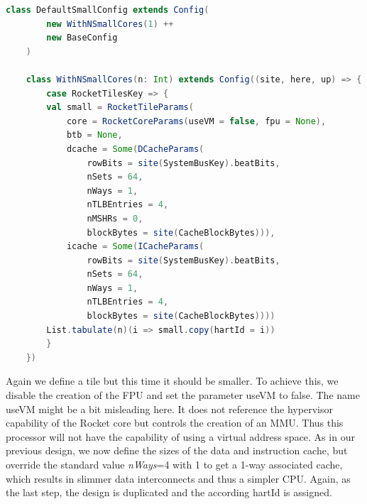 \begin{lstlisting}[language=scala, frame=single]
    class DefaultSmallConfig extends Config(
        new WithNSmallCores(1) ++
        new BaseConfig
    )

    class WithNSmallCores(n: Int) extends Config((site, here, up) => {
        case RocketTilesKey => {
        val small = RocketTileParams(
            core = RocketCoreParams(useVM = false, fpu = None),
            btb = None,
            dcache = Some(DCacheParams(
                rowBits = site(SystemBusKey).beatBits,
                nSets = 64,
                nWays = 1,
                nTLBEntries = 4,
                nMSHRs = 0,
                blockBytes = site(CacheBlockBytes))),
            icache = Some(ICacheParams(
                rowBits = site(SystemBusKey).beatBits,
                nSets = 64,
                nWays = 1,
                nTLBEntries = 4,
                blockBytes = site(CacheBlockBytes))))
        List.tabulate(n)(i => small.copy(hartId = i))
        }
    })
\end{lstlisting}
Again we define a tile but this time it should be smaller.
To achieve this, we disable the creation of
the FPU and set the parameter useVM to false.
The name useVM might be a bit misleading here.
It does not reference the hypervisor capability of the
Rocket core but controls the creation of an MMU.
Thus this processor will
not have the capability of using a virtual address space.
As in our previous design, we now define the sizes of the
data and instruction cache, but override the standard value
\textit{nWays}=4 with 1 to get a 1-way associated cache, which results
in slimmer data interconnects and thus a simpler CPU.
Again, as the last step, the design is duplicated and
the according hartId is assigned.

